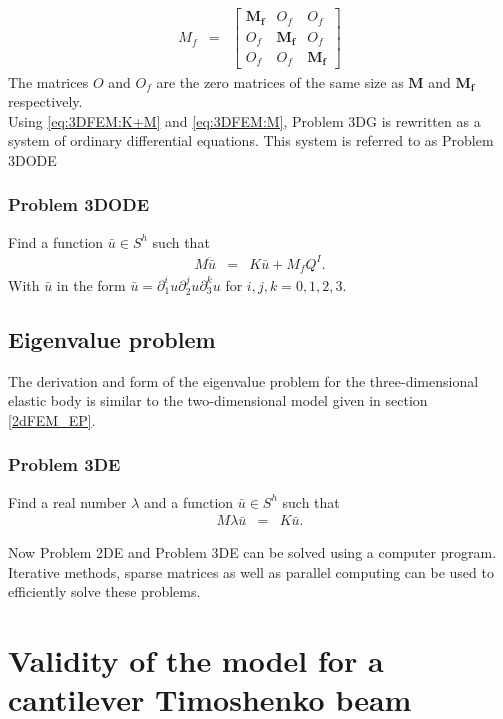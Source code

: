 	\begin{eqnarray}
		M_f & = &
		\begin{bmatrix}
			\mathbf{M_f} & {O_f} & {O_f}\\
			{O_f} & \mathbf{M_f} & {O_f}\\
			{O_f} & {O_f} & \mathbf{M_f}
		\end{bmatrix}\label{eq:3DFEM:M}
	\end{eqnarray}
	The matrices ${O}$ and ${O_f}$ are the zero matrices of the same size as $\mathbf{M}$ and $\mathbf{M_f}$ respectively.\\

	Using \eqref{eq:3DFEM:K+M} and \eqref{eq:3DFEM:M}, Problem 3DG is rewritten as a system of ordinary differential equations. This system is referred to as Problem 3DODE

	\subsubsection*{Problem 3DODE}
	Find a function $\bar{u} \in S^h$ such that
	\begin{eqnarray}
		M\ddot{\bar{u}} & = & K\bar{u} + M_{f}Q^I. \label{3D_M}
	\end{eqnarray} With $\bar{u}$ in the form $\bar{u} = \partial^i_1u \partial^j_2u \partial^k_3u$ for $i,j,k = 0,1,2,3$.

	\subsection*{Eigenvalue problem}
	The derivation and form of the eigenvalue problem for the three-dimensional elastic body is similar to the two-dimensional model given in section \ref{2dFEM_EP}.

	\subsubsection*{Problem 3DE}\label{3dFEM_EP}
	Find a real number $\lambda$ and a function $\bar{u} \in S^h$ such that
	\begin{eqnarray}
		M\lambda{\bar{u}} & = & K\bar{u}.
	\end{eqnarray}

	Now Problem 2DE and Problem 3DE can be solved using a computer program. Iterative methods, sparse matrices as well as parallel computing can be used to efficiently solve these problems.

\section{Validity of the model for a cantilever Timoshenko beam} \label{sec:validity-of-a-cantilever-timoshenko-beam}

